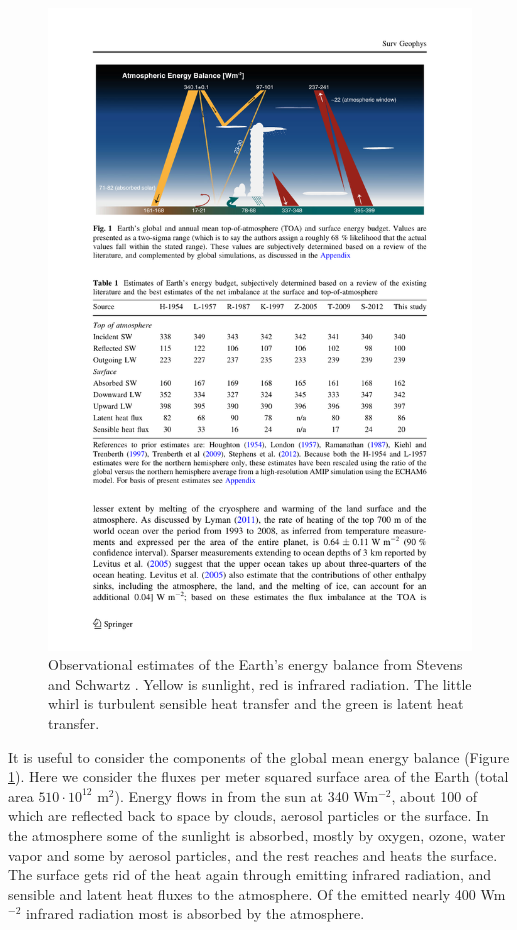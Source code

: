 \documentclass[12pt]{book}
\begin{document}
\begin{figure}
\begin{center}
\includegraphics[width=15 cm]{../external_figures/Stevens_Schwartz_2012_energy_flows.pdf}
\end{center}
\caption{ Observational estimates of the Earth's energy balance from Stevens and Schwartz \citep{Stevens2012}. Yellow is sunlight, red is infrared radiation. The little whirl is turbulent sensible heat transfer and the green is latent heat transfer. } 
\label{fig:energy_flows}
\end{figure}

It is useful to consider the components of the global mean energy balance (Figure \ref{fig:energy_flows}). Here we consider the fluxes per meter squared surface area of the Earth (total area $510\cdot 10^{12}$ m$^2$). Energy flows in from the sun at 340 Wm$^{-2}$, about 100 of which are reflected back to space by clouds, aerosol particles or the surface. In the atmosphere some of the sunlight is absorbed, mostly by oxygen, ozone, water vapor and some by aerosol particles, and the rest reaches and heats the surface. The surface gets rid of the heat again through emitting infrared radiation, and sensible and latent heat fluxes to the atmosphere. Of the emitted nearly 400 Wm$^{-2}$ infrared radiation most is absorbed by the atmosphere.
\end{document}
